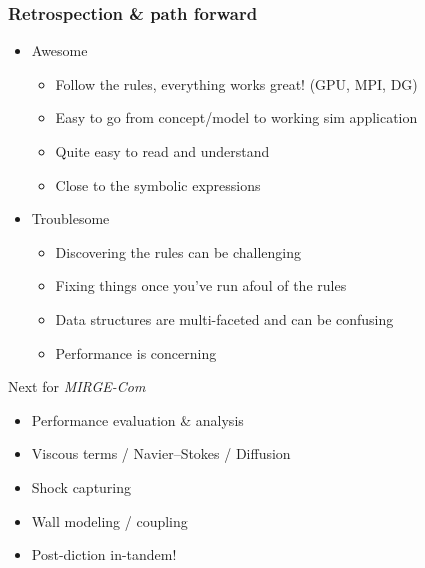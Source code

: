 \begin{frame}\frametitle{Retrospection \& path forward}
  \begin{multicols}{2}
    \begin{itemize}
    \item Awesome
      \begin{itemize}
      \item Follow the rules, everything works great! (GPU, MPI, DG)
      \item Easy to go from concept/model to working sim application
      \item Quite easy to read and understand 
      \item Close to the symbolic expressions
      \end{itemize}
      \columnbreak
    \item Troublesome
      \begin{itemize}
      \item Discovering the rules can be challenging
      \item Fixing things once you've run afoul of the rules
      \item Data structures are multi-faceted and can be confusing
      \item Performance is concerning
      \end{itemize}
    \end{itemize}
  \end{multicols}
  \begin{center}
    Next for \textit{MIRGE-Com}
  \end{center}
  \begin{multicols}{2}
    \begin{itemize}
    \item Performance evaluation \& analysis 
    \item Viscous terms / Navier--Stokes / Diffusion
    \item Shock capturing 
    \item Wall modeling / coupling 
    \item Post-diction in-tandem! 
    \end{itemize}
  \end{multicols}
\end{frame}



